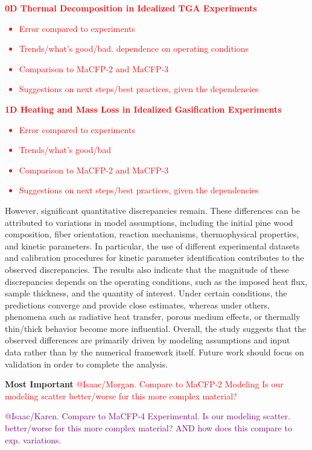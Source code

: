 \documentclass{article}
\begin{document}
\textcolor{red}{
\textbf{0D Thermal Decomposition in Idealized TGA Experiments}\\
\begin{itemize}[]
	\item Error compared to experiments
	\item Trends/what's good/bad. dependence on operating conditions
	\item Comparison to MaCFP-2 and MaCFP-3
	\item Suggestions on next steps/best practices, given the dependencies
\end{itemize}
\textbf{1D Heating and Mass Loss in Idealized Gasification Experiments}\\
\begin{itemize}[]
	\item Error compared to experiments
	\item Trends/what's good/bad
	\item Comparison to MaCFP-2 and MaCFP-3
	\item Suggestions on next steps/best practices, given the dependencies
\end{itemize}
}
However, significant quantitative discrepancies remain. These differences can be attributed to variations in model assumptions, including the initial pine wood composition, fiber orientation, reaction mechanisms, thermophysical properties, and kinetic parameters. In particular, the use of different experimental datasets and calibration procedures for kinetic parameter identification contributes to the observed discrepancies. The results also indicate that the magnitude of these discrepancies depends on the operating conditions, such as the imposed heat flux, sample thickness, and the quantity of interest. Under certain conditions, the predictions converge and provide close estimates, whereas under others, phenomena such as radiative heat transfer, porous medium effects, or thermally thin/thick behavior become more influential. Overall, the study suggests that the observed differences are primarily driven by modeling assumptions and input data rather than by the numerical framework itself. Future work should focus on validation in order to complete the analysis.


\textbf{Most Important}
\textcolor{red}{@Isaac/Morgan. Compare to MaCFP-2 Modeling Is our modeling scatter better/worse for this more complex material?}
\textcolor{purple}{@Isaac/Karen. Compare to MaCFP-4 Experimental. Is our modeling scatter. better/worse for this more complex material? AND how does this compare to exp. variations.
	
	
}
\clearpage
\end{document}
